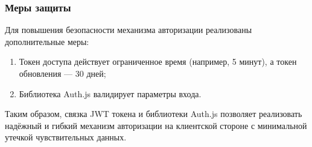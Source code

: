 \subsubsection{Меры защиты}
Для повышения безопасности механизма авторизации реализованы дополнительные меры:

\begin{enumerate}
  \item Токен доступа действует ограниченное время (например, 5 минут), а токен обновления — 30 дней;
  \item Библиотека Auth.js валидирует параметры входа.
\end{enumerate}

Таким образом, связка JWT токена и библиотеки Auth.js позволяет реализовать надёжный и гибкий механизм авторизации на клиентской стороне с минимальной утечкой чувствительных данных.